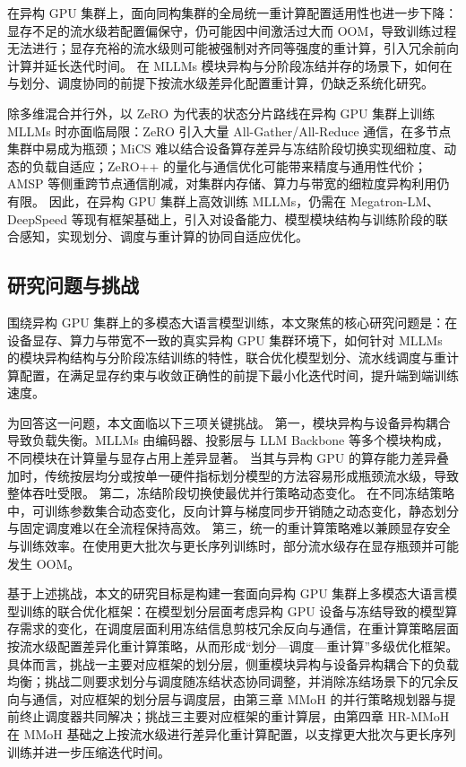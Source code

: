 在异构 GPU 集群上，面向同构集群的全局统一重计算配置适用性也进一步下降：显存不足的流水级若配置偏保守，仍可能因中间激活过大而 OOM，导致训练过程无法进行；显存充裕的流水级则可能被强制对齐同等强度的重计算，引入冗余前向计算并延长迭代时间。
在 MLLMs 模块异构与分阶段冻结并存的场景下，如何在与划分、调度协同的前提下按流水级差异化配置重计算，仍缺乏系统化研究。

除多维混合并行外，以 ZeRO 为代表的状态分片路线在异构 GPU 集群上训练 MLLMs 时亦面临局限：ZeRO\cite{zero2020,zero2021} 引入大量 All-Gather/All-Reduce 通信，在多节点集群中易成为瓶颈；MiCS\cite{mics2022} 难以结合设备算存差异与冻结阶段切换实现细粒度、动态的负载自适应；ZeRO++\cite{zeroplusplus} 的量化与通信优化可能带来精度与通用性代价；AMSP\cite{amsp} 等侧重跨节点通信削减，对集群内存储、算力与带宽的细粒度异构利用仍有限。
因此，在异构 GPU 集群上高效训练 MLLMs，仍需在 Megatron-LM、DeepSpeed 等现有框架基础上，引入对设备能力、模型模块结构与训练阶段的联合感知，实现划分、调度与重计算的协同自适应优化。

\subsection{研究问题与挑战}

围绕异构 GPU 集群上的多模态大语言模型训练，本文聚焦的核心研究问题是：在设备显存、算力与带宽不一致的真实异构 GPU 集群环境下，如何针对 MLLMs 的模块异构结构与分阶段冻结训练的特性，联合优化模型划分、流水线调度与重计算配置，在满足显存约束与收敛正确性的前提下最小化迭代时间，提升端到端训练速度。

为回答这一问题，本文面临以下三项关键挑战。
第一，模块异构与设备异构耦合导致负载失衡。MLLMs 由编码器、投影层与 LLM Backbone 等多个模块构成，不同模块在计算量与显存占用上差异显著。
当其与异构 GPU 的算存能力差异叠加时，传统按层均分或按单一硬件指标划分模型的方法容易形成瓶颈流水级，导致整体吞吐受限。
第二，冻结阶段切换使最优并行策略动态变化。
在不同冻结策略中，可训练参数集合动态变化，反向计算与梯度同步开销随之动态变化，静态划分与固定调度难以在全流程保持高效。
第三，统一的重计算策略难以兼顾显存安全与训练效率。在使用更大批次与更长序列训练时，部分流水级存在显存瓶颈并可能发生 OOM。

基于上述挑战，本文的研究目标是构建一套面向异构 GPU 集群上多模态大语言模型训练的联合优化框架：在模型划分层面考虑异构 GPU 设备与冻结导致的模型算存需求的变化，在调度层面利用冻结信息剪枝冗余反向与通信，在重计算策略层面按流水级配置差异化重计算策略，从而形成“划分—调度—重计算”多级优化框架。
具体而言，挑战一主要对应框架的划分层，侧重模块异构与设备异构耦合下的负载均衡；挑战二则要求划分与调度随冻结状态协同调整，并消除冻结场景下的冗余反向与通信，对应框架的划分层与调度层，由第三章 MMoH 的并行策略规划器与提前终止调度器共同解决；挑战三主要对应框架的重计算层，由第四章 HR-MMoH 在 MMoH 基础之上按流水级进行差异化重计算配置，以支撑更大批次与更长序列训练并进一步压缩迭代时间。

